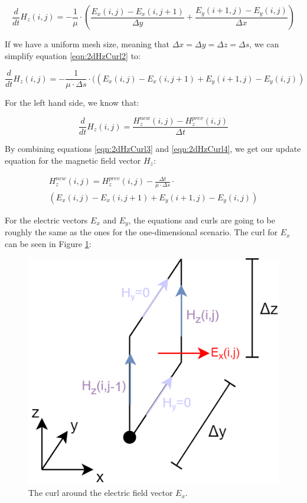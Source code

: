 \begin{equation}
	\label{eqn:2dHzCurl2}
	\frac{d}{dt} H_z(i,j) = -\frac{1}{\mu} \cdot (\frac{E_x(i,j) - E_x(i,j+1)}{\Delta y} + \frac{E_y(i+1,j)- E_y(i,j)}{\Delta x})
\end{equation}

If we have a uniform mesh size, meaning that $\Delta x = \Delta y =  \Delta z = \Delta s$, we can simplify equation \ref{eqn:2dHzCurl2} to:

\begin{equation}
	\label{eqn:2dHzCurl3}
	\frac{d}{dt} H_z(i,j) = -\frac{1}{\mu \cdot \Delta s} \cdot ((E_x(i,j) - E_x(i,j+1) + E_y(i+1,j)- E_y(i,j))
\end{equation}

For the left hand side, we know that:

\begin{equation}
	\label{eqn:2dHzCurl4}
	\frac{d}{dt} H_z(i,j) = \frac{H_z^{new}(i,j) - H_z^{prev}(i,j)}{\Delta t}
\end{equation}

By combining equations \ref{eqn:2dHzCurl3} and \ref{eqn:2dHzCurl4}, we get our update equation for the magnetic field vector $H_z$:

\begin{multline}
	\label{eqn:2dHzCurlFinal}
	H_z^{new}(i,j) =  H_z^{prev}(i,j) -\frac{\Delta t}{\mu \cdot \Delta s} \cdot \\ (E_x(i,j) - E_x(i,j+1) + E_y(i+1,j)- E_y(i,j))
\end{multline}

For the electric vectors $E_x$ and $E_y$, the equations and curls are going to be roughly the same as the ones for the one-dimensional scenario. The curl for $E_x$ can be seen in Figure \ref{fig:fdtd2dEx}:

\begin{figure}[h!]
	\centering
	\includegraphics[scale=0.6]{Figures/fdtd2dEx}
	\decoRule
	\caption[2D TE Mode - $E_x$ vector curl]{The curl around the electric field vector $E_x$.}
	\label{fig:fdtd2dEx}
\end{figure}

